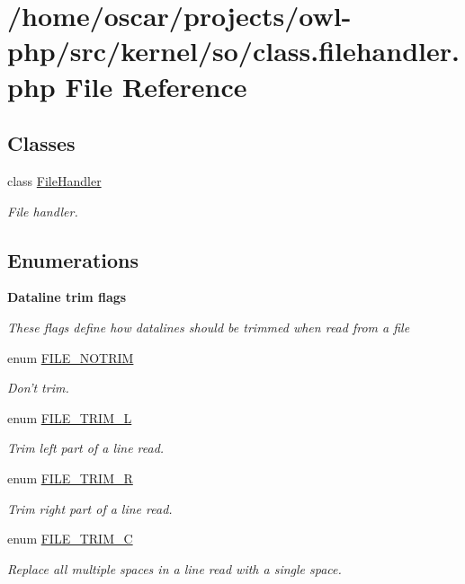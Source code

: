 \section{/home/oscar/projects/owl-\/php/src/kernel/so/class.filehandler.php File Reference}
\label{class_8filehandler_8php}
\subsection*{Classes}
\begin{DoxyCompactItemize}
\item 
class \hyperlink{classFileHandler}{FileHandler}
\begin{DoxyCompactList}\small\item\em File handler. \item\end{DoxyCompactList}\end{DoxyCompactItemize}
\subsection*{Enumerations}
\begin{Indent}{\bf Dataline trim flags}\par
{\em \label{_amgrp09e264f44360b2d7954f16ee5d28e654}
 These flags define how datalines should be trimmed when read from a file }\begin{DoxyCompactItemize}
\item 
enum \hyperlink{class_8filehandler_8php_a3720f2e15eb9e16e29d8ecbb96763662}{FILE\_\-NOTRIM} 
\begin{DoxyCompactList}\small\item\em Don't trim. \item\end{DoxyCompactList}\item 
enum \hyperlink{class_8filehandler_8php_a080de95fd7cf2e8d8ac78ac7ad9471ee}{FILE\_\-TRIM\_\-L} 
\begin{DoxyCompactList}\small\item\em Trim left part of a line read. \item\end{DoxyCompactList}\item 
enum \hyperlink{class_8filehandler_8php_a7ee25ec88036b90f5a0ae8be7bc41769}{FILE\_\-TRIM\_\-R} 
\begin{DoxyCompactList}\small\item\em Trim right part of a line read. \item\end{DoxyCompactList}\item 
enum \hyperlink{class_8filehandler_8php_a2787c3a1ecef8697c863800d0b2848a4}{FILE\_\-TRIM\_\-C} 
\begin{DoxyCompactList}\small\item\em Replace all multiple spaces in a line read with a single space. \item\end{DoxyCompactList}\end{DoxyCompactItemize}
\end{Indent}


